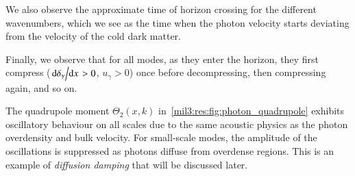 We also observe the approximate time of horizon crossing for the different wavenumbers, which we see as the time when the photon velocity starts deviating from the velocity of the cold dark matter.

Finally, we observe that for all modes, as they enter the horizon, they first compress ($\dv*{\delta_\gamma}{x}> 0$, $u_\gamma> 0$) once before decompressing, then compressing again, and so on. 






The quadrupole moment $\Theta_2(x,k)$ in~\cref{mil3:res:fig:photon_quadrupole} exhibits oscillatory behaviour on all scales due to the same acoustic physics as the photon overdensity and bulk velocity. For small-scale modes, the amplitude of the oscillations is suppressed as photons diffuse from overdense regions. This is an example of \textit{diffusion damping} that will be discussed later. 


